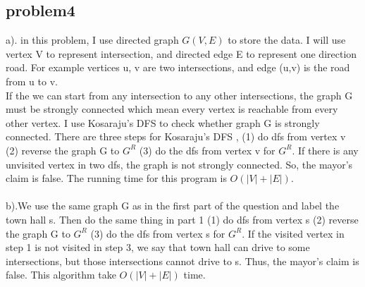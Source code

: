 \documentclass[11pt]{article}
\begin{document}
\subsection{problem4}
a). in this problem, I use directed graph $G(V,E)$ to store the data. I will use vertex V to represent intersection, and directed edge E to represent one direction road. For example vertices u, v are two intersections, and edge (u,v) is the road from u to v.\\
If the we can start from any intersection to any other intersections, the graph G must be strongly connected which mean every vertex is reachable from every other vertex. I use Kosaraju’s DFS to check whether graph G is strongly connected. There are three steps for Kosaraju’s DFS , (1) do dfs from vertex v (2) reverse the graph G to $G^R$ (3) do the dfs from vertex v for $G^R$. If there is any unvisited vertex in two dfs, the graph is not strongly connected. So, the mayor's claim is false. The running time for this program is $O(|V|+|E|)$.\\
\\
b).We use the same graph G as in the first part of the question and label the town hall s. Then do the same thing in part 1 (1) do dfs from vertex s (2) reverse the graph G to $G^R$ (3) do the dfs from vertex s for $G^R$. If the visited vertex in step 1 is not visited in step 3, we say that town hall can drive to some intersections, but those intersections cannot drive to s. Thus, the mayor's claim is false. This algorithm take $O(|V|+|E|)$ time. 
\end{document}
